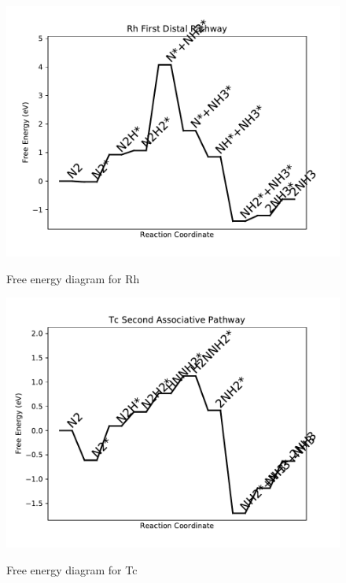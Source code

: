 \documentclass{article}
\begin{document}
\newpage
\begin{figure}
\includegraphics[width=1\linewidth]{data/plots/Rh_distal_1.pdf}
\label{fig:Rh_distal_1}
\caption{Free energy diagram for Rh}
\end{figure}

\begin{figure}
\includegraphics[width=1\linewidth]{data/plots/Tc_associative_2.pdf}
\label{fig:Tc_associative_2}
\caption{Free energy diagram for Tc}
\end{figure}
\end{document}
